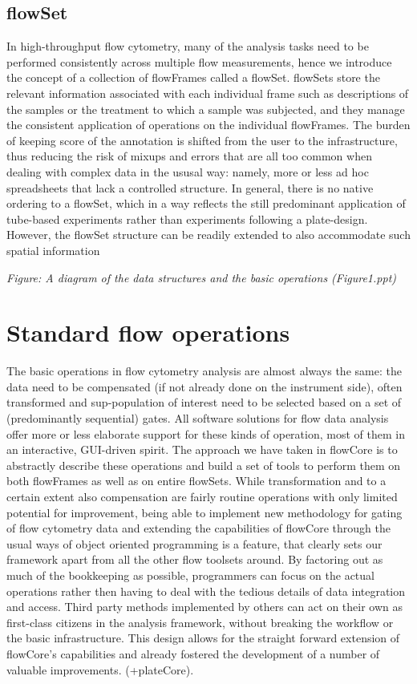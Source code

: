 \documentclass[12pt]{article}
\begin{document}
\subsection*{flowSet}
In high-throughput flow cytometry, many of the analysis tasks need to
be performed consistently across multiple flow measurements, hence we
introduce the concept of a collection of flowFrames called a
flowSet. flowSets store the relevant information associated with each
individual frame such as descriptions of the samples or the treatment
to which a sample was subjected, and they manage the consistent
application of operations on the individual flowFrames. The burden of
keeping score of the annotation is shifted from the user to the
infrastructure, thus reducing the risk of mixups and errors that are
all too common when dealing with complex data in the ususal way:
namely, more or less ad hoc spreadsheets that lack a controlled
structure. In general, there is no native ordering to a flowSet, which
in a way reflects the still predominant application of tube-based
experiments rather than experiments following a plate-design. However,
the flowSet structure can be readily extended to also accommodate such
spatial information \citep{(plateCore)}


\textit{Figure: A diagram of the data structures and the basic
  operations (Figure1.ppt)}



\section*{Standard flow operations}
The basic operations in flow cytometry analysis are almost always the
same: the data need to be compensated (if not already done on the
instrument side), often transformed and sup-population of interest
need to be selected based on a set of (predominantly sequential)
gates. All software solutions for flow data analysis offer more or
less elaborate support for these kinds of operation, most of them in
an interactive, GUI-driven spirit. The approach we have taken in
flowCore is to abstractly describe these operations and build a set of
tools to perform them on both flowFrames as well as on entire
flowSets. While transformation and to a certain extent also
compensation are fairly routine operations with only limited potential
for improvement, being able to implement new methodology for gating of
flow cytometry data and extending the capabilities of flowCore through
the usual ways of object oriented programming is a feature, that
clearly sets our framework apart from all the other flow toolsets
around. By factoring out as much of the bookkeeping as possible,
programmers can focus on the actual operations rather then having to
deal with the tedious details of data integration and access. Third
party methods implemented by others can act on their own as
first-class citizens in the analysis framework, without breaking the
workflow or the basic infrastructure. This design allows for the
straight forward extension of flowCore's capabilities and already
fostered the development of a number of valuable
improvements. \citep{lo2008agf} (+plateCore).
\end{document}
